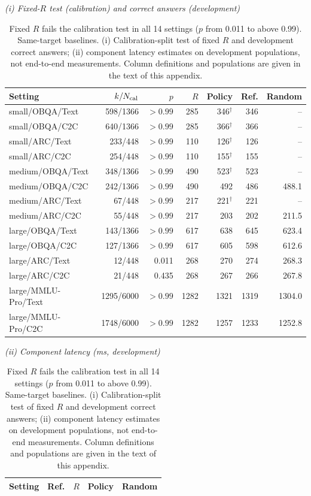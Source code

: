 \begin{table}[h]\centering\footnotesize
\caption{Fixed $R$ fails the calibration test in all 14 settings ($p$ from 0.011 to above 0.99). Same-target baselines. (i) Calibration-split test of fixed $R$ and development correct answers; (ii) component latency estimates on development populations, not end-to-end measurements. Column definitions and populations are given in the text of this appendix.}
\label{tab:baselines}
\textit{(i) Fixed-$R$ test (calibration) and correct answers (development)}\par\smallskip
\begin{tabular}{lrrrrrr}\toprule
Setting & $k/N_{\rm cal}$ & $p$ & $R$ & Policy & Ref. & Random\\\midrule
small/OBQA/Text & 598/1366 & $>0.99$ & 285 & 346$^\dagger$ & 346 & --\\
small/OBQA/C2C & 640/1366 & $>0.99$ & 285 & 366$^\dagger$ & 366 & --\\
small/ARC/Text & 233/448 & $>0.99$ & 110 & 126$^\dagger$ & 126 & --\\
small/ARC/C2C & 254/448 & $>0.99$ & 110 & 155$^\dagger$ & 155 & --\\
medium/OBQA/Text & 348/1366 & $>0.99$ & 490 & 523$^\dagger$ & 523 & --\\
medium/OBQA/C2C & 242/1366 & $>0.99$ & 490 & 492 & 486 & 488.1\\
medium/ARC/Text & 67/448 & $>0.99$ & 217 & 221$^\dagger$ & 221 & --\\
medium/ARC/C2C & 55/448 & $>0.99$ & 217 & 203 & 202 & 211.5\\
large/OBQA/Text & 143/1366 & $>0.99$ & 617 & 638 & 645 & 623.4\\
large/OBQA/C2C & 127/1366 & $>0.99$ & 617 & 605 & 598 & 612.6\\
large/ARC/Text & 12/448 & 0.011 & 268 & 270 & 274 & 268.3\\
large/ARC/C2C & 21/448 & 0.435 & 268 & 267 & 266 & 267.8\\
large/MMLU-Pro/Text & 1295/6000 & $>0.99$ & 1282 & 1321 & 1319 & 1304.0\\
large/MMLU-Pro/C2C & 1748/6000 & $>0.99$ & 1282 & 1257 & 1233 & 1252.8\\
\bottomrule\end{tabular}
\par\medskip
\textit{(ii) Component latency (ms, development)}\par\smallskip
\begin{tabular}{lrrrr}\toprule
Setting & Ref. & $R$ & Policy & Random\\\midrule

\end{tabular}
\end{table}
